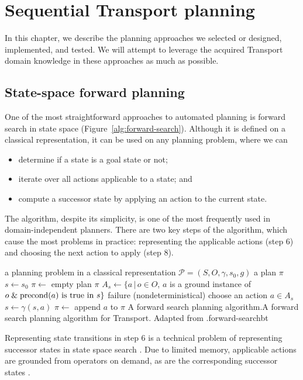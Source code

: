 \chapter{Sequential Transport planning}

In this chapter, we describe the planning approaches we
selected or designed, implemented, and tested.
We will attempt to leverage the acquired
Transport domain knowledge
in these approaches as much as possible.

\section{State-space forward planning}\label{forward-planning}

One of the most straightforward approaches to automated planning
is forward search \citep[Section~4.2]{Ghallab2004}
in state space (Figure~\ref{alg:forward-search}).
Although it is defined on a classical representation,
it can be used on any planning problem, where we can
\begin{itemize}
\item determine if a state is a goal state or not;
\item iterate over all actions applicable to a state; and
\item compute a successor state by applying an action to the current state.
\end{itemize}
The algorithm, despite its simplicity, is one of the most frequently
used in domain-independent planners.
There are two key steps of the algorithm, which
cause the most problems in practice: representing
the applicable actions (step 6) and choosing the
next action to apply (step 8).

%
{%
\Input a planning problem in a classical representation $\mathcal{P} = (S, O, \gamma, s_0, g)$
\Output a plan $\pi$
\State $s \gets s_0$ 
\State $\pi \gets $ empty plan
\Loop
{} \Return $\pi$ \EndIf
\State $A_s \gets \{a \,|\, o \in O$, $a$ is a ground instance of $o \;\&\; \textrm{precond}(a) \textrm{ is true in } s\}$
 \Return failure \EndIf
\State (nondeterministical) choose an action $a \in A_s$
\State $s \gets \gamma(s, a)$
\State $\pi \gets$ append $a$ to $\pi$
\EndLoop
\EndFunction
}%
{A forward search planning algorithm.}{A forward search planning algorithm for Transport. Adapted from \citet[Figure~4.1]{Ghallab2004}.}{forward-search}{bt}

Representing state transitions in step 6
is a technical problem of representing successor states
in state space search \citep[Section~3.2]{Russell1995}.
Due to limited memory,
applicable actions are grounded from operators
on demand, as are the corresponding successor states
\citep[Section~3.4]{Russell1995}.


